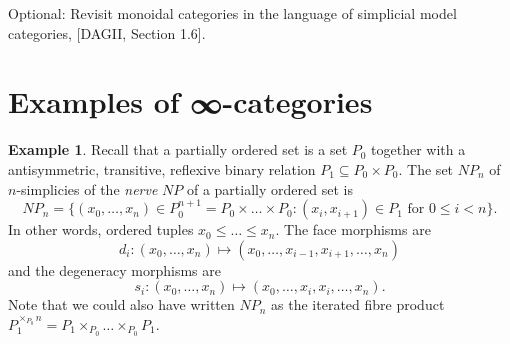 \documentclass[a4paper]{amsart}
\numberwithin{figure}{section}
\theoremstyle{theorem}
\theoremstyle{definition}
\newtheorem{exam}[thm]{Example}
\begin{document}
Optional: Revisit monoidal categories in the language of simplicial model categories, [DAGII, Section 1.6]. %
%
%
%
%
%
%
%

\section*{Examples of ∞-categories}

\begin{exam} \label{exam:poset}
Recall that a partially ordered set is a set $P_0$ together with a antisymmetric, transitive, reflexive binary relation $P_1 \subseteq P_0 \times P_0$. The set $NP_n$ of $n$-simplicies of the \emph{nerve} $NP$ of a partially ordered set is 
\[ NP_n = \{ (x_0, \dots, x_n) \in P_0^{n+1} = P_0 \times \dots \times P_0 : (x_i, x_{i+1}) \in P_1\textrm{ for } 0 \leq i < n \}. \]
In other words, ordered tuples $x_0 \leq \dots \leq x_n$. The face morphisms are
\[ d_i: (x_0, \dots, x_n) \mapsto (x_0, \dots, x_{i-1}, x_{i+1}, \dots, x_n) \]
and the degeneracy morphisms are 
\[ s_i: (x_0, \dots, x_n) \mapsto (x_0, \dots, x_{i}, x_i, \dots, x_n). \]
Note that we could also have written $NP_n$ as the iterated fibre product $P_1^{\times_{P_0} n} = P_1 \times_{P_0} \dots \times_{P_0} P_1$. 
\end{exam}
\end{document}
